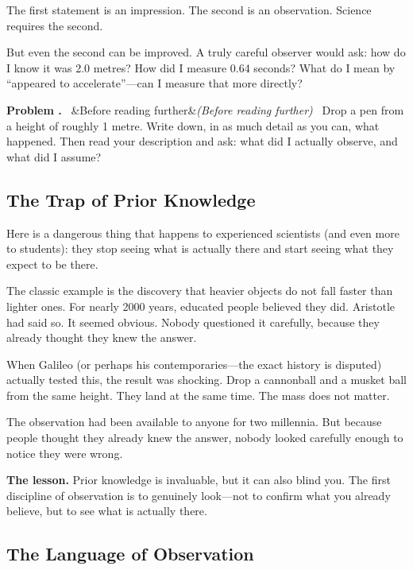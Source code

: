 \documentclass[12pt, a4paper, twoside]{book}
\newcounter{problem}[chapter]
\newcommand{\problem}[1][]{%
  \refstepcounter{problem}%
  \medskip\noindent
  \textcolor{accent}{\textbf{Problem \theproblem.}}\ %
  \ifx&#1&\else\textit{(#1)}\ \fi%
}
\theoremstyle{disc}
\begin{document}
The first statement is an impression. The second is an observation. Science requires the second.

But even the second can be improved. A truly careful observer would ask: how do I know it was 2.0 metres? How did I measure 0.64 seconds? What do I mean by ``appeared to accelerate''---can I measure that more directly?

\begin{explobox}
\problem[Before reading further] Drop a pen from a height of roughly 1 metre. Write down, in as much detail as you can, what happened. Then read your description and ask: what did I actually observe, and what did I assume?
\end{explobox}

\subsection{The Trap of Prior Knowledge}

Here is a dangerous thing that happens to experienced scientists (and even more to students): they stop seeing what is actually there and start seeing what they expect to be there.

The classic example is the discovery that heavier objects do not fall faster than lighter ones. For nearly 2000 years, educated people believed they did. Aristotle had said so. It seemed obvious. Nobody questioned it carefully, because they already thought they knew the answer.

When Galileo (or perhaps his contemporaries---the exact history is disputed) actually tested this, the result was shocking. Drop a cannonball and a musket ball from the same height. They land at the same time. The mass does not matter.

The observation had been available to anyone for two millennia. But because people thought they already knew the answer, nobody looked carefully enough to notice they were wrong.

\begin{discoverybox}
\textbf{The lesson.} Prior knowledge is invaluable, but it can also blind you. The first discipline of observation is to genuinely look---not to confirm what you already believe, but to see what is actually there.
\end{discoverybox}

\subsection{The Language of Observation}
\end{document}

